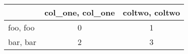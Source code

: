 \begin{tabular}{lcc}
\toprule
 & col_one, col_one & coltwo, coltwo \\
\midrule
foo, foo & 0 & 1 \\
bar, bar & 2 & 3 \\
\bottomrule
\end{tabular}
